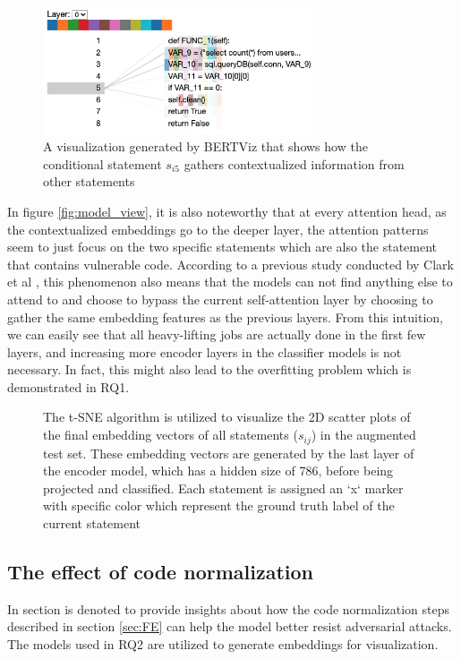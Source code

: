 \documentclass{ieeeaccess}
\begin{document}
\begin{figure}[h]
  \centering
    \includegraphics[width=80mm, align=center]{attention_heads_details.png}
    \caption{A visualization generated by BERTViz\cite{bertviz} that shows how the conditional statement $s_{i5}$ gathers contextualized information from other statements  }
    \label{fig:attention_view}
\end{figure}
 \par In figure \ref{fig:model_view}, it is also noteworthy that at every attention head, as  the contextualized embeddings go to the deeper layer, the attention patterns seem to just focus on the two specific statements which are also the statement that contains vulnerable code.  According to a previous study conducted by Clark et al \cite{bert_insignt}, this phenomenon also means that the models can not find anything else to attend to and choose to bypass the current self-attention layer by choosing to gather the same embedding features as the previous layers. From this intuition, we can easily see that all  heavy-lifting jobs are actually done in the first few layers, and increasing more encoder layers in the classifier models is not necessary. In fact, this might also lead to the overfitting problem which is demonstrated in RQ1.
 \begin{figure}[h]
    \centering
    
    \caption{ The t-SNE algorithm is utilized to visualize the 2D scatter plots of the final embedding vectors of all statements ($s_{ij}$) in the augmented test set. These embedding vectors are generated by the last layer of the encoder model, which has a hidden size of 786, before being projected and classified. Each statement is assigned an `x`  marker with  specific color which represent the ground truth label of the current statement} 
    \label{fig:embeddings_visualize}  
\end{figure}
\subsection{The effect of code normalization}\label{sec:code_normalization_insight}
In section is denoted to provide insights about how the code normalization steps described in section \ref{sec:FE} can help the model better resist adversarial attacks. The models  used in RQ2 are utilized to generate embeddings for  visualization.
\end{document}
